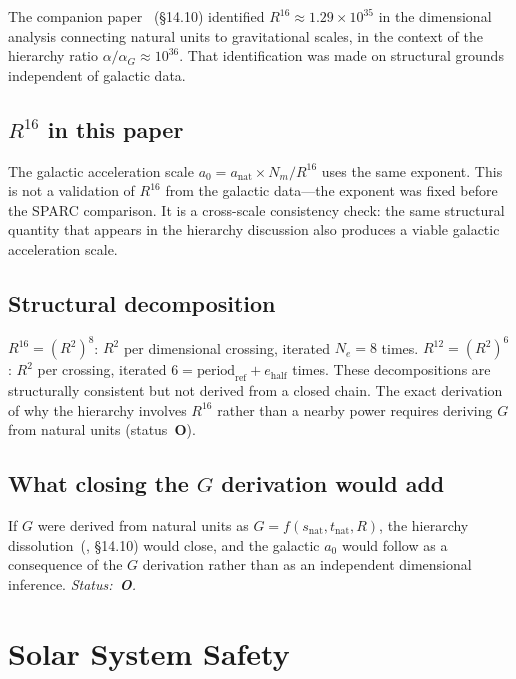 \documentclass[11pt,a4paper]{article}
\begin{document}
The companion paper~\cite{Wells2026c} (\S14.10) identified $R^{16} \approx 1.29 \times 10^{35}$ in the dimensional analysis connecting natural units to gravitational scales, in the context of the hierarchy ratio $\alpha/\alpha_G \approx 10^{36}$.
That identification was made on structural grounds independent of galactic data.

\subsection{$R^{16}$ in this paper}

The galactic acceleration scale $a_0 = a_{\mathrm{nat}} \times N_m / R^{16}$ uses the same exponent.
This is not a validation of $R^{16}$ from the galactic data---the exponent was fixed before the SPARC comparison.
It is a cross-scale consistency check: the same structural quantity that appears in the hierarchy discussion also produces a viable galactic acceleration scale.

\subsection{Structural decomposition}

$R^{16} = (R^2)^8$: $R^2$ per dimensional crossing, iterated $N_e = 8$ times.
$R^{12} = (R^2)^6$: $R^2$ per crossing, iterated $6 = \mathrm{period}_{\mathrm{ref}} + e_{\mathrm{half}}$ times.
These decompositions are structurally consistent but not derived from a closed chain.
The exact derivation of why the hierarchy involves $R^{16}$ rather than a nearby power requires deriving $G$ from natural units (status~\textbf{O}).

\subsection{What closing the $G$ derivation would add}

If $G$ were derived from natural units as $G = f(s_{\mathrm{nat}}, t_{\mathrm{nat}}, R)$, the hierarchy dissolution~(\cite{Wells2026c}, \S14.10) would close, and the galactic $a_0$ would follow as a consequence of the $G$ derivation rather than as an independent dimensional inference.
\textit{Status:~\textbf{O}.}

\section{Solar System Safety}
\label{sec:solar}
\end{document}
